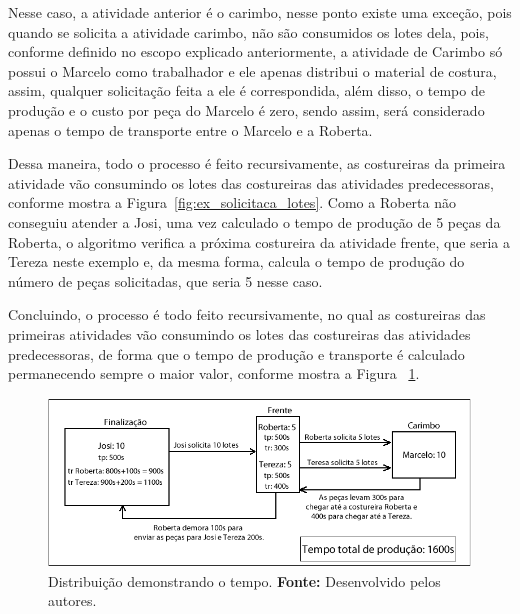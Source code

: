 \par Nesse caso, a atividade anterior é o carimbo, nesse ponto existe uma exceção, pois quando 
se solicita a atividade carimbo, não são consumidos os lotes dela, pois, conforme definido 
no escopo explicado anteriormente, a atividade de Carimbo só possui o Marcelo como trabalhador e ele
apenas distribui o material de costura, assim, qualquer solicitação feita a ele é correspondida, além disso, o 
tempo de produção e o custo por peça do Marcelo é zero, sendo assim, será
considerado apenas o tempo de transporte entre o Marcelo e a Roberta.

\par Dessa maneira, todo  o processo é feito recursivamente, as costureiras
da primeira atividade vão consumindo os lotes das costureiras das atividades
predecessoras, conforme mostra a Figura~\ref{fig:ex_solicitaca_lotes}.
Como a Roberta não conseguiu atender a Josi, uma vez calculado o tempo de produção de 5 peças da Roberta, 
o algoritmo verifica a próxima costureira da atividade frente, que seria a Tereza neste exemplo e, da mesma forma, calcula
o tempo de produção do número de peças solicitadas, que seria 5 nesse caso.

\par Concluindo, o processo é todo feito recursivamente, no qual as costureiras das primeiras atividades vão consumindo
os lotes das costureiras das atividades predecessoras, de forma que o tempo de produção e transporte é calculado permanecendo 
sempre o maior valor, conforme mostra a Figura ~\ref{fig:ex_tempo_producao}. 

\newpage

\begin{figure}[h!]
	\centerline{\includegraphics[width=14cm]{./imagens/distribuicao_tempo.png}}
	\caption[Distribuição demonstrando o tempo.]
	{Distribuição demonstrando o tempo.
		\textbf{Fonte:} Desenvolvido pelos autores.}
	\label{fig:ex_tempo_producao}
\end{figure}

